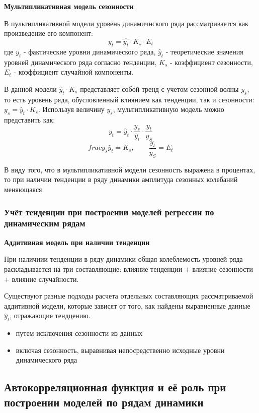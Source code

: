 \documentclass[aps,%
12pt,%
final,%
oneside,
onecolumn,%
musixtex, %
superscriptaddress,%
centertags]{article} %
\theoremstyle{plain}
\theoremstyle{definition}
\theoremstyle{remark}
\begin{document}
\textbf{Мультипликативная модель сезонности}

В пультипликативной модели уровень динамичнского ряда рассматривается как произведение его компонент:
$$y_t = \hat{y_t} \cdot K_s \cdot E_t$$
где $y_t$ - фактические уровни динамического ряда, $\hat{y}_t$ - теоретические значения уровней динамического ряда согласно тенденции, $K_s$ - коэффициент сезонности, $E_t$ - коэффициент случайной компоненты.

В данной модели $\hat{y}_t \cdot K_s$ представляет собой тренд с учетом сезонной волны $y_s$, то есть уровень ряда, обусловленный влиянием как тенденции, так и сезонности: $y_s = \hat{y}_t \cdot K_s$. Используя величину $y_s$, мультипликативную модель можно представить как:
$$y_t = \hat{y}_t \cdot \frac{y_s}{\hat{y}_t} \cdot \frac{y_t}{y_S}$$
$$frac{y_s}{\hat{y}_t} = K_s, \qquad \frac{y_t}{y_S} = E_t$$

В виду того, что в мультипликативной модели сезонность выражена в процентах, то при наличии тенденции в ряду динамики амплитуда сезонных колебаний меняющаяся.

\subsubsection{Учёт тенденции при построении моделей регрессии по динамическим рядам}

\textbf{Аддитивная модель при наличии тенденции}

При наличиии тенденции в ряду динамики общая колеблемость уровней ряда раскладывается на три составляющие: влияние тенденции $+$ влияние сезонности $+$ влияние случайности.

Существуют разные подходы расчета отдельных составляющих
рассматриваемой аддитивной модели, которые зависят от того, как найдены
выравненные данные $\hat{y}_t$, отражающие тендцению.

\begin{itemize}
	\item путем исключения сезонности из данных
	\item включая сезонность, выравнивая непосредственно исходные уровни динамического ряда
\end{itemize}

\newpage
\subsection{Автокорреляционная функция и её роль при построении моделей по рядам динамики}
\end{document}
